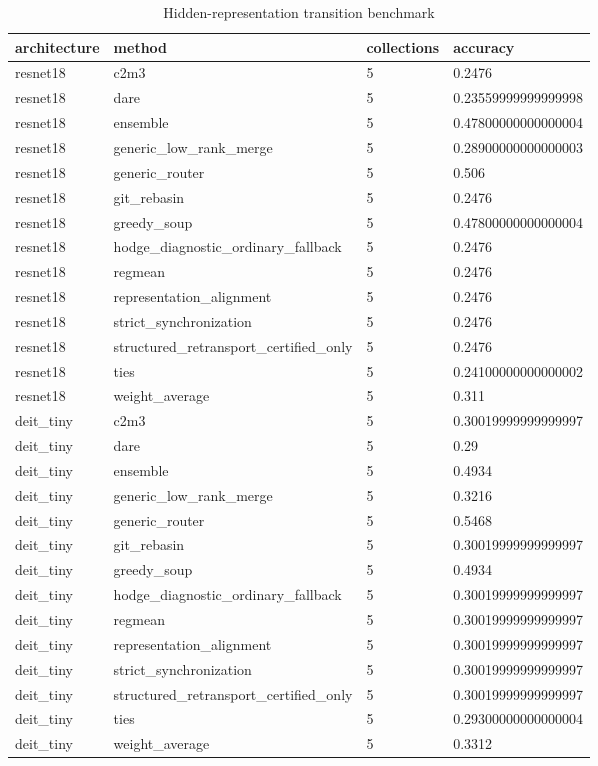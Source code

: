 \begin{table}[t]
\centering
\caption{Hidden-representation transition benchmark}
\begin{tabular}{llll}
\toprule
architecture & method & collections & accuracy \\
\midrule
resnet18 & c2m3 & 5 & 0.2476 \\
resnet18 & dare & 5 & 0.23559999999999998 \\
resnet18 & ensemble & 5 & 0.47800000000000004 \\
resnet18 & generic\_low\_rank\_merge & 5 & 0.28900000000000003 \\
resnet18 & generic\_router & 5 & 0.506 \\
resnet18 & git\_rebasin & 5 & 0.2476 \\
resnet18 & greedy\_soup & 5 & 0.47800000000000004 \\
resnet18 & hodge\_diagnostic\_ordinary\_fallback & 5 & 0.2476 \\
resnet18 & regmean & 5 & 0.2476 \\
resnet18 & representation\_alignment & 5 & 0.2476 \\
resnet18 & strict\_synchronization & 5 & 0.2476 \\
resnet18 & structured\_retransport\_certified\_only & 5 & 0.2476 \\
resnet18 & ties & 5 & 0.24100000000000002 \\
resnet18 & weight\_average & 5 & 0.311 \\
deit\_tiny & c2m3 & 5 & 0.30019999999999997 \\
deit\_tiny & dare & 5 & 0.29 \\
deit\_tiny & ensemble & 5 & 0.4934 \\
deit\_tiny & generic\_low\_rank\_merge & 5 & 0.3216 \\
deit\_tiny & generic\_router & 5 & 0.5468 \\
deit\_tiny & git\_rebasin & 5 & 0.30019999999999997 \\
deit\_tiny & greedy\_soup & 5 & 0.4934 \\
deit\_tiny & hodge\_diagnostic\_ordinary\_fallback & 5 & 0.30019999999999997 \\
deit\_tiny & regmean & 5 & 0.30019999999999997 \\
deit\_tiny & representation\_alignment & 5 & 0.30019999999999997 \\
deit\_tiny & strict\_synchronization & 5 & 0.30019999999999997 \\
deit\_tiny & structured\_retransport\_certified\_only & 5 & 0.30019999999999997 \\
deit\_tiny & ties & 5 & 0.29300000000000004 \\
deit\_tiny & weight\_average & 5 & 0.3312 \\
\bottomrule
\end{tabular}
\end{table}
